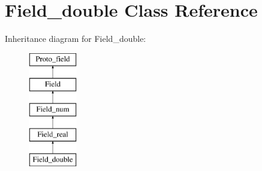 \hypertarget{classField__double}{}\section{Field\+\_\+double Class Reference}
\label{classField__double}
Inheritance diagram for Field\+\_\+double\+:\begin{figure}[H]
\begin{center}
\leavevmode
\includegraphics[height=5.000000cm]{classField__double}
\end{center}
\end{figure}
